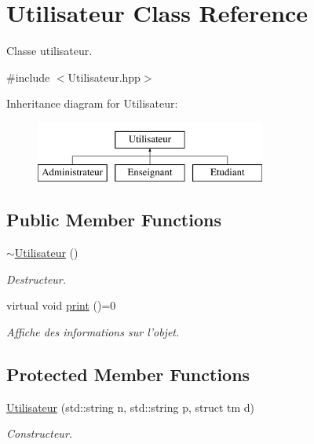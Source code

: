 \hypertarget{classUtilisateur}{\section{Utilisateur Class Reference}
\label{classUtilisateur}
}


Classe utilisateur.  




{\ttfamily \#include $<$Utilisateur.\-hpp$>$}

Inheritance diagram for Utilisateur\-:\begin{figure}[H]
\begin{center}
\leavevmode
\includegraphics[height=2.000000cm]{classUtilisateur}
\end{center}
\end{figure}
\subsection*{Public Member Functions}
\begin{DoxyCompactItemize}
\item 
\hyperlink{classUtilisateur_a6631539ceecd6140fe525eb91485537b}{$\sim$\-Utilisateur} ()
\begin{DoxyCompactList}\small\item\em Destructeur. \end{DoxyCompactList}\item 
\hypertarget{classUtilisateur_ac71ffe02a37249b5435a630e77703b43}{virtual void \hyperlink{classUtilisateur_ac71ffe02a37249b5435a630e77703b43}{print} ()=0}\label{classUtilisateur_ac71ffe02a37249b5435a630e77703b43}

\begin{DoxyCompactList}\small\item\em Affiche des informations sur l'objet. \end{DoxyCompactList}\end{DoxyCompactItemize}
\subsection*{Protected Member Functions}
\begin{DoxyCompactItemize}
\item 
\hyperlink{classUtilisateur_ae8d5371a46526ec435295ab84cb23555}{Utilisateur} (std\-::string n, std\-::string p, struct tm d)
\begin{DoxyCompactList}\small\item\em Constructeur. \end{DoxyCompactList}\end{DoxyCompactItemize}
